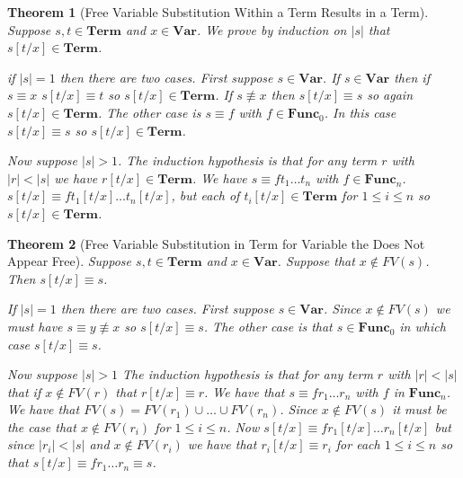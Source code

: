 \documentclass[12pt]{article}
\theoremstyle{break}
\theoremstyle{break}
\newtheorem{theorem}{Theorem}[section]
\theoremstyle{break}
\theoremstyle{break}
\theoremstyle{break}
\newtheorem{informal definition}[definition]{Informal Definition}
\begin{document}
\begin{theorem}[Free Variable Substitution Within a Term Results in a Term]
\label{thm:fvsubintermgivesterm}
Suppose $s, t\in\textbf{Term}$ and $x\in\textbf{Var}$.
We prove by induction on $|s|$ that $s[t/x] \in \textbf{Term}$.

if $|s| = 1$ then there are two cases.
First suppose $s\in \textbf{Var}$.
If $s\in \textbf{Var}$ then if $s\equiv x$ $s[t/x] \equiv t$ so $s[t/x]\in\textbf{Term}$.
If $s \not \equiv x$ then $s[t/x] \equiv s$ so again $s[t/x] \in \textbf{Term}$.
The other case is $s\equiv f$ with $f\in \textbf{Func}_0$.
In this case $s[t/x] \equiv s$ so $s[t/x] \in \textbf{Term}$.

Now suppose $|s| > 1$.
The induction hypothesis is that for any term $r$ with $|r|<|s|$ we have $r[t/x] \in \textbf{Term}$.
We have $s\equiv ft_1\ldots t_n$ with $f\in\textbf{Func}_n$. $s[t/x] \equiv f t_1[t/x]\ldots t_n[t/x]$, but each of $t_i[t/x]\in\textbf{Term}$ for $1\le i \le n$ so $s[t/x]\in\textbf{Term}$.
\end{theorem}

\begin{theorem}[Free Variable Substitution in Term for Variable the Does Not Appear Free]
\label{thm:fvsubtermvarnotappear}
Suppose $s, t \in \textbf{Term}$ and $x \in \textbf{Var}$. Suppose that $x\not \in FV(s)$. Then $s[t/x] \equiv s$.

If $|s| = 1$ then there are two cases. First suppose $s\in \textbf{Var}$. Since $x\not \in FV(s)$ we must have $s \equiv y \not \equiv x$ so $s[t/x] \equiv s$. The other case is that $s\in \textbf{Func}_0$ in which case $s[t/x]\equiv s$.

Now suppose $|s|>1$ The induction hypothesis is that for any term $r$ with $|r| < |s|$ that if $x \not \in FV(r)$ that $r[t/x] \equiv r$. We have that $s \equiv fr_1\ldots r_n$ with $f$ in $\textbf{Func}_n$. We have that $FV(s) = FV(r_1)\cup\ldots\cup FV(r_n)$. Since $x\not \in FV(s)$ it must be the case that $x \not \in FV(r_i)$ for $1\le i \le n$. Now $s[t/x] \equiv fr_1[t/x]\ldots r_n[t/x]$ but since $|r_i|<|s|$ and $x\not \in FV(r_i)$ we have that $r_i[t/x] \equiv r_i$ for each $1\le i \le n$ so that $s[t/x] \equiv fr_1\ldots r_n \equiv s$.
\end{theorem}
\end{document}
